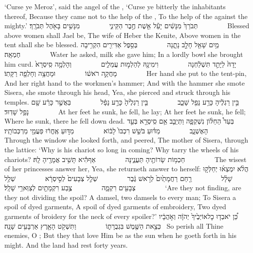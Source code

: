 {‘Curse ye Meroz’, said the angel of the \lord, ‘Curse ye bitterly the inhabitants thereof, Because they came not to the help of the \lord, To the help of the \lord\space against the mighty.’}
{תְּבֹרַךְ֙ מִנָּשִׁ֔ים יָעֵ֕ל אֵ֖שֶׁת חֶ֣בֶר הַקֵּינִ֑י         מִנָּשִׁ֥ים בָּאֹ֖הֶל תְּבֹרָֽךְ׃        }
{Blessed above women shall Jael be, The wife of Heber the Kenite, Above women in the tent shall she be blessed.}
{מַ֥יִם שָׁאַ֖ל חָלָ֣ב נָתָ֑נָה         בְּסֵ֥פֶל אַדִּירִ֖ים הִקְרִ֥יבָה חֶמְאָֽה׃        }
{Water he asked, milk she gave him; In a lordly bowl she brought him curd.}
{יָדָהּ֙ לַיָּתֵ֣ד תִּשְׁלַ֔חְנָה         וִימִינָ֖הּ לְהַלְמ֣וּת עֲמֵלִ֑ים         וְהָלְמָ֤ה סִֽיסְרָא֙ מָחֲקָ֣ה רֹאשׁ֔וֹ         וּמָחֲצָ֥ה וְחָלְפָ֖ה רַקָּתֽוֹ׃        }
{Her hand she put to the tent-pin, And her right hand to the workmen’s hammer; And with the hammer she smote Sisera, she smote through his head, Yea, she pierced and struck through his temples.}
{בֵּ֣ין רַגְלֶ֔יהָ כָּרַ֥ע נָפַ֖ל שָׁכָ֑ב         בֵּ֤ין רַגְלֶ֙יהָ֙ כָּרַ֣ע נָפָ֔ל         בַּאֲשֶׁ֣ר כָּרַ֔ע שָׁ֖ם נָפַ֥ל שָׁדֽוּד׃        }
{At her feet he sunk, he fell, he lay; At her feet he sunk, he fell; Where he sunk, there he fell down dead.}
{בְּעַד֩ הַחַלּ֨וֹן נִשְׁקְפָ֧ה וַתְּיַבֵּ֛ב אֵ֥ם סִֽיסְרָ֖א בְּעַ֣ד הָאֶשְׁנָ֑ב         מַדּ֗וּעַ בֹּשֵׁ֤שׁ רִכְבּוֹ֙ לָב֔וֹא         מַדּ֣וּעַ אֶֽחֱר֔וּ פַּעֲמֵ֖י מַרְכְּבוֹתָֽיו׃        }
{Through the window she looked forth, and peered, The mother of Sisera, through the lattice: ‘Why is his chariot so long in coming? Why tarry the wheels of his chariots?}
{חַכְמ֥וֹת שָׂרוֹתֶ֖יהָ תַּעֲנֶ֑ינָּה         אַף\maqqaf הִ֕יא תָּשִׁ֥יב אֲמָרֶ֖יהָ לָֽהּ׃        }
{The wisest of her princesses answer her, Yea, she returneth answer to herself:}
{הֲלֹ֨א יִמְצְא֜וּ יְחַלְּק֣וּ שָׁלָ֗ל         רַ֤חַם רַחֲמָתַ֙יִם֙ לְרֹ֣אשׁ גֶּ֔בֶר         שְׁלַ֤ל צְבָעִים֙ לְסִ֣יסְרָ֔א         שְׁלַ֥ל צְבָעִ֖ים רִקְמָ֑ה         צֶ֥בַע רִקְמָתַ֖יִם לְצַוְּארֵ֥י שָׁלָֽל׃        }
{‘Are they not finding, are they not dividing the spoil? A damsel, two damsels to every man; To Sisera a spoil of dyed garments, A spoil of dyed garments of embroidery, Two dyed garments of broidery for the neck of every spoiler?’}
{כֵּ֠ן יֹאבְד֤וּ כׇל\maqqaf אוֹיְבֶ֙יךָ֙ יְהֹוָ֔ה וְאֹ֣הֲבָ֔יו כְּצֵ֥את הַשֶּׁ֖מֶשׁ בִּגְבֻרָת֑וֹ         וַתִּשְׁקֹ֥ט הָאָ֖רֶץ אַרְבָּעִ֥ים שָׁנָֽה׃ \petucha }
{So perish all Thine enemies, O \lord; But they that love Him be as the sun when he goeth forth in his might. And the land had rest forty years.}
